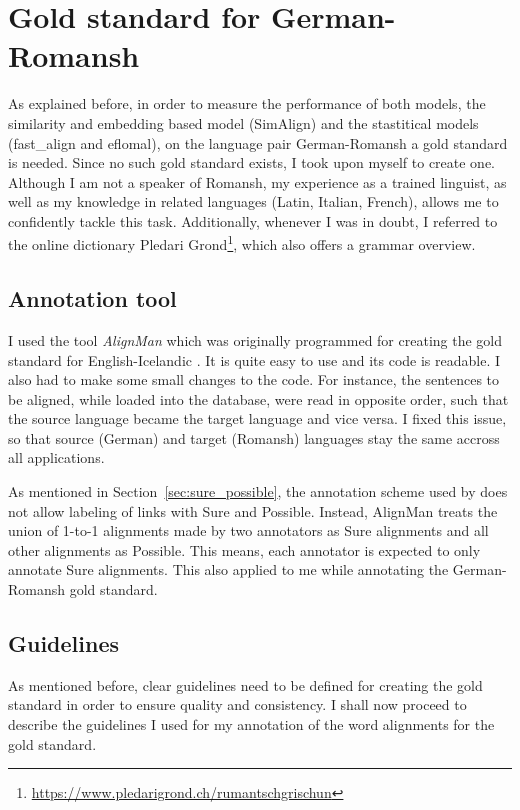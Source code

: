 \section{Gold standard for German-Romansh}
As explained before, in order to measure the performance of both models, the similarity and embedding based model (SimAlign) and the stastitical models (fast\_align and eflomal), on the language pair German-Romansh a gold standard is needed. 
Since no such gold standard exists, I took upon myself to create one. 
Although I am not a speaker of Romansh, my experience as a trained linguist, as well as my knowledge in related languages (Latin, Italian, French), allows me to confidently tackle this task. 
Additionally, whenever I was in doubt, I referred to the online dictionary Pledari Grond\footnote{\url{https://www.pledarigrond.ch/rumantschgrischun}}, which also offers a grammar overview. 

\subsection{Annotation tool}
\label{sec:AlignMan}
I used the tool \emph{AlignMan} which was originally programmed for creating the gold standard for English-Icelandic \autocite{steingrimsson-etal-2021-combalign}. 
It is quite easy to use and its code is readable. 
I also had to make some small changes to the code. 
For instance, the sentences to be aligned, while loaded into the database, were read in opposite order, such that the source language became the target language and vice versa. 
I fixed this issue, so that source (German) and target (Romansh) languages stay the same accross all applications.

As mentioned in Section~\ref{sec:sure_possible}, the annotation scheme used by \cite{steingrimsson-etal-2021-combalign} does not allow labeling of links with Sure and Possible. 
Instead, AlignMan treats the union of 1-to-1 alignments made by two annotators as Sure alignments and all other alignments as Possible. 
This means, each annotator is expected to only annotate Sure alignments. This also applied to me while annotating the German-Romansh gold standard. 


\subsection{Guidelines}
As mentioned before, clear guidelines need to be defined for creating the gold standard in order to ensure quality and consistency. I shall now proceed to describe the guidelines I used for my annotation of the word alignments for the gold standard.


